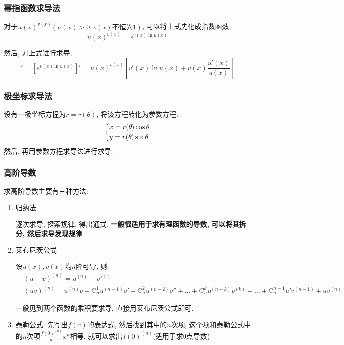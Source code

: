 \subsubsection{幂指函数求导法}
对于$ u(x)^{v(x)}(u(x)>0,v(x)\text{不恒为}1) $, 可以将上式先化成指数函数:
\begin{equation*}
u(x)^{v(x)}=e^{v(x)\ln u(x)}
\end{equation*}\par 
然后, 对上式进行求导,
\begin{equation*}
[u(x)^{v(x)}]'=[e^{v(x)\ln u(x)}]'=u(x)^{v(x)}[v'(x)\ln u(x)+v(x)\frac{u'(x)}{u(x)}]
\end{equation*}
\subsubsection{极坐标求导法}
设有一极坐标方程为$ r=r(\theta) $, 将该方程转化为参数方程:
\begin{equation*}
\scaleleftright[6pt]{\biggl\{}{
\begin{aligned}
& x=r(\theta)\cos \theta \\
& y=r(\theta)\sin \theta
\end{aligned} }{.}
\end{equation*}
然后, 再用参数方程求导法进行求导.
\subsubsection{高阶导数}
求高阶导数主要有三种方法:
\begin{enumerate}
\item 归纳法 \par 逐次求导, 探索规律, 得出通式. \textbf{一般很适用于求有理函数的导数, 可以将其拆分, 然后求导发现规律}
\item 莱布尼茨公式 \par 设$ u(x),v(x) $均$ n $阶可导, 则:
\begin{equation*}
\begin{aligned}
& (u\pm v)^{(n)}=u^{(n)}\pm v^{(n)} \\
& (uv)^{(n)}=u^{(n)}v+\mathrm{C}_{n}^{1}u^{(n-1)}v'+\mathrm{C}_{n}^{2}u^{(n-2)}v''+\dots+\mathrm{C}_{n}^{k}u^{(n-k)}v^{(k)}+\dots+\mathrm{C}_{n}^{n-1}u'v^{(n-1)}+uv^{(n)}
\end{aligned}
\end{equation*}\par
一般见到两个函数的乘积要求导, 直接用莱布尼茨公式即可.
\item 泰勒公式: 先写出$ f(x) $的表达式, 然后找到其中的$ n $次项, 这个项和泰勒公式中的$ n $次项$ \frac{f(0)^{(n)}}{n!}x^{n} $相等, 就可以求出$ f(0)^{(n)} $(适用于求$ 0 $点导数)
\end{enumerate}
